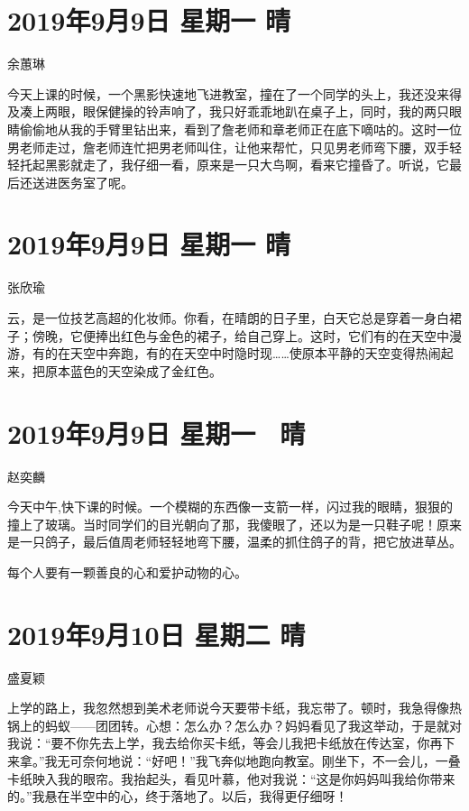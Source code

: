 \section{2019年9月9日 星期一 晴}

余蕙琳

今天上课的时候，一个黑影快速地飞进教室，撞在了一个同学的头上，我还没来得及凑上两眼，眼保健操的铃声响了，我只好乖乖地趴在桌子上，同时，我的两只眼睛偷偷地从我的手臂里钻出来，看到了詹老师和章老师正在底下嘀咕的。这时一位男老师走过，詹老师连忙把男老师叫住，让他来帮忙，只见男老师弯下腰，双手轻轻托起黑影就走了，我仔细一看，原来是一只大鸟啊，看来它撞昏了。听说，它最后还送进医务室了呢。

\section{2019年9月9日 星期一 晴}

张欣瑜

云，是一位技艺高超的化妆师。你看，在晴朗的日子里，白天它总是穿着一身白裙子；傍晚，它便捧出红色与金色的裙子，给自己穿上。这时，它们有的在天空中漫游，有的在天空中奔跑，有的在天空中时隐时现\ldots\ldots 使原本平静的天空变得热闹起来，把原本蓝色的天空染成了金红色。

\section{2019年9月9日 星期一~ 晴}

赵奕麟

今天中午,快下课的时候。一个模糊的东西像一支箭一样，闪过我的眼睛，狠狠的撞上了玻璃。当时同学们的目光朝向了那，我傻眼了，还以为是一只鞋子呢！原来是一只鸽子，最后值周老师轻轻地弯下腰，温柔的抓住鸽子的背，把它放进草丛。

每个人要有一颗善良的心和爱护动物的心。

\section{2019年9月10日 星期二 晴}

盛夏颖

上学的路上，我忽然想到美术老师说今天要带卡纸，我忘带了。顿时，我急得像热锅上的蚂蚁------团团转。心想：怎么办？怎么办？妈妈看见了我这举动，于是就对我说：``要不你先去上学，我去给你买卡纸，等会儿我把卡纸放在传达室，你再下来拿。''我无可奈何地说：``好吧！''我飞奔似地跑向教室。刚坐下，不一会儿，一叠卡纸映入我的眼帘。我抬起头，看见叶慕，他对我说：``这是你妈妈叫我给你带来的。''我悬在半空中的心，终于落地了。以后，我得更仔细呀！


